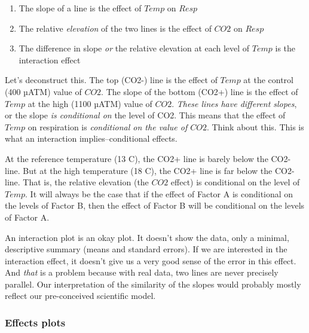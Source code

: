 \documentclass[]{book}
\providecommand{\tightlist}{%
  \setlength{\itemsep}{0pt}\setlength{\parskip}{0pt}}
\begin{document}
\begin{enumerate}
\def\labelenumi{\arabic{enumi}.}
\tightlist
\item
  The slope of a line is the effect of \(Temp\) on \(Resp\)
\item
  The relative \emph{elevation} of the two lines is the effect of
  \(CO2\) on \(Resp\)
\item
  The difference in slope \emph{or} the relative elevation at each level
  of \(Temp\) is the interaction effect
\end{enumerate}

Let's deconstruct this. The top (CO2-) line is the effect of \(Temp\) at
the control (400 µATM) value of \(CO2\). The slope of the bottom (CO2+)
line is the effect of \(Temp\) at the high (1100 µATM) value of \(CO2\).
\emph{These lines have different slopes}, or the slope \emph{is
conditional on} the level of CO2. This means that the effect of \(Temp\)
on respiration is \emph{conditional on the value of \(CO2\)}. Think
about this. This is what an interaction implies--conditional effects.

At the reference temperature (13 C), the CO2+ line is barely below the
CO2- line. But at the high temperature (18 C), the CO2+ line is far
below the CO2- line. That is, the relative elevation (the \(CO2\)
effect) is conditional on the level of \(Temp\). It will always be the
case that if the effect of Factor A is conditional on the levels of
Factor B, then the effect of Factor B will be conditional on the levels
of Factor A.

An interaction plot is an okay plot. It doesn't show the data, only a
minimal, descriptive summary (means and standard errors). If we are
interested in the interaction effect, it doesn't give us a very good
sense of the error in this effect. And \emph{that} is a problem because
with real data, two lines are never precisely parallel. Our
interpretation of the similarity of the slopes would probably mostly
reflect our pre-conceived scientific model.

\subsubsection{Effects plots}\label{effects-plots}
\end{document}

